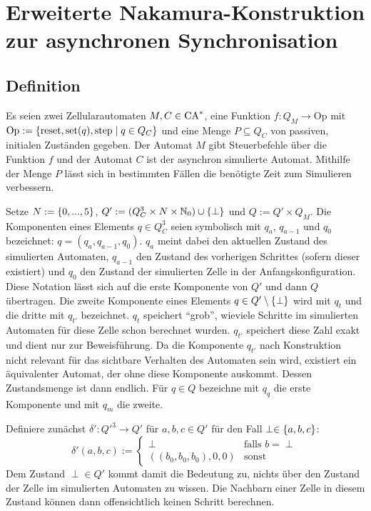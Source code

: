 \chapter{Erweiterte Nakamura-Konstruktion zur asynchronen Synchronisation}
\label{chap:ErweiterteNakamuraKonstr}

\section{Definition}

\begin{definition}
    \label{erweiterteNakamuraKonstruktion}
    Es seien zwei Zellularautomaten $M, C \in \textrm{CA}^*$, eine Funktion $f: Q_M \to \mathrm{Op}$ mit $\mathrm{Op} := \{ {
        \mathrm{reset}, \mathrm{set}(q), \mathrm{step} } \; | \; { q \in Q_C } \}$ und eine Menge $P \subseteq Q_C$ von passiven, initialen Zuständen gegeben.
    Der Automat $M$ gibt Steuerbefehle über die Funktion $f$ und der Automat $C$ ist der asynchron simulierte Automat.
    Mithilfe der Menge $P$ lässt sich in bestimmten Fällen
    die benötigte Zeit zum Simulieren verbessern.
    
    Setze $N := \{ { 0, ..., 5 } \}$, $Q' := (Q_C^3 \times N \times \mathbb{N}_0) \cup \{ { \perp } \}$ und $Q := Q' \times Q_M$.
    Die Komponenten eines Elements $q \in Q_C^3$ seien symbolisch mit $q_a$, $q_{a-1}$ und $q_0$ bezeichnet: $q = (q_a, q_{a-1}, q_0)$.
    $q_a$ meint dabei den aktuellen Zustand des simulierten Automaten, $q_{a-1}$ den Zustand des vorherigen Schrittes (sofern dieser existiert) und $q_0$ den Zustand der simulierten Zelle in der Anfangskonfiguration.
    Diese Notation lässt sich auf die erste Komponente von $Q'$ und dann $Q$ übertragen. Die zweite Komponente eines Elements $q \in Q' \setminus \{ { \perp } \}$ wird mit $q_t$ und die dritte mit $q_{t'}$ bezeichnet. $q_t$ speichert \enquote{grob}, wieviele Schritte im simulierten Automaten für diese Zelle schon berechnet wurden. $q_{t'}$ speichert diese Zahl exakt und dient nur zur Beweisführung. Da die Komponente $q_{t'}$
    nach Konstruktion nicht relevant für das sichtbare Verhalten des Automaten sein wird, existiert ein äquivalenter Automat, der ohne diese Komponente auskommt. Dessen Zustandsmenge ist dann endlich.
    Für $q \in Q$ bezeichne mit $q_q$ die erste Komponente und mit $q_m$ die zweite.
    
    Definiere zunächst $\delta': {Q'}^3 \to Q'$ für $a, b, c \in Q'$ für den Fall $\perp \in \{ { a, b, c } \}$:
    \[
        \delta'(a, b, c) := 
        \begin{cases}
            \perp & \text{falls } b = \perp \\
            ((b_0, b_0, b_0), 0, 0) & \text{sonst}
        \end{cases}
    \]
    Dem Zustand $\perp \in Q'$ kommt damit die Bedeutung zu, nichts über den Zustand der Zelle im simulierten Automaten zu wissen.
    Die Nachbarn einer Zelle in diesem Zustand können dann offensichtlich keinen Schritt berechnen.
    

\end{definition}
